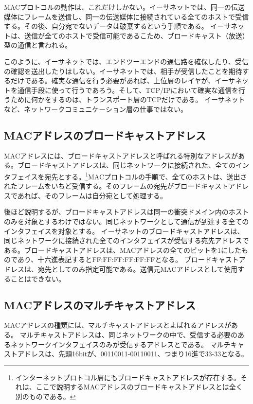 MACプロトコルの動作は、これだけしかない。イーサネットでは、同一の伝送媒体にフレームを送信し、同一の伝送媒体に接続されている全てのホストで受信する。その後、自分宛でないデータは破棄するという手順である。
イーサネットは、送信が全てのホストで受信可能であるこため、ブロードキャスト（放送）型の通信と言われる。

このように、イーサネットでは、エンドツーエンドの通信路を確保したり、受信の確認を送出したりはしない。イーサネットでは、相手が受信したことを期待するだけである。確実な通信を行う必要があれば、上位層のレイヤが、イーサネットを通信手段に使って行うであろう。そして、TCP/IPにおいて確実な通信を行うために何かをするのは、トランスポート層のTCPだけである。
イーサネットなど、ネットワークコミュニケーション層の仕事ではない。


\subsection{MACアドレスのブロードキャストアドレス}

MACアドレスには、ブロードキャストアドレスと呼ばれる特別なアドレスがある。ブロードキャストアドレスは、同じネットワークに接続された、全てのインタフェイスを宛先とする。\footnote{インターネットプロトコル層にもブロードキャストアドレスが存在する。それは、ここで説明するMACアドレスのブロードキャストアドレスとは全く別のものである。}MACプロトコルの手順で、全てのホストは、送出されたフレームをいちど受信する。そのフレームの宛先がブロードキャストアドレスであれば、そのフレームは自分宛として処理する。

後ほど説明するが、ブロードキャストアドレスは同一の衝突ドメイン内のホストのみを対象とするわけではない。同じネットワークとして通信が到達する全てのインタフェイスを対象とする。
イーサネットのブロードキャストアドレスは、同じネットワークに接続された全てのインタフェイスが受信する宛先アドレスである。ブロードキャストアドレスは、MACアドレスの全てのビットを1にしたものであり、十六進表記するとFF:FF:FF:FF:FF:FFとなる。
ブロードキャストアドレスは、宛先としてのみ指定可能である。送信元MACアドレスとして使用することはできない。

\subsection{MACアドレスのマルチキャストアドレス}
MACアドレスの種類には、マルチキャストアドレスとよばれるアドレスがある。
マルチキャストアドレスは、同じネットワークの中で、受信する必要のあるネットワークインタフェイスのみが受信するアドレスとである。
マルチキャストアドレスは、先頭16bitが、00110011-00110011、つまり16進で33-33となる。

